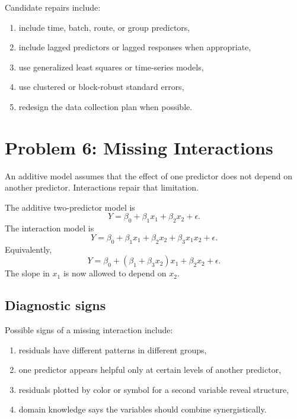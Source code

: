 Candidate repairs include:
\begin{enumerate}
  \item include time, batch, route, or group predictors,
  \item include lagged predictors or lagged responses when appropriate,
  \item use generalized least squares or time-series models,
  \item use clustered or block-robust standard errors,
  \item redesign the data collection plan when possible.
\end{enumerate}

\section{Problem 6: Missing Interactions}

An additive model assumes that the effect of one predictor does not depend on another predictor.  Interactions repair that limitation.

The additive two-predictor model is
\begin{equation}
  Y=\beta_0+\beta_1x_1+\beta_2x_2+\epsilon.
\end{equation}
The interaction model is
\begin{equation}
  Y=\beta_0+\beta_1x_1+\beta_2x_2+\beta_3x_1x_2+\epsilon.
\end{equation}
Equivalently,
\begin{equation}
  Y=\beta_0+(\beta_1+\beta_3x_2)x_1+\beta_2x_2+\epsilon.
\end{equation}
The slope in \(x_1\) is now allowed to depend on \(x_2\).

\subsection*{Diagnostic signs}

Possible signs of a missing interaction include:
\begin{enumerate}
  \item residuals have different patterns in different groups,
  \item one predictor appears helpful only at certain levels of another predictor,
  \item residuals plotted by color or symbol for a second variable reveal structure,
  \item domain knowledge says the variables should combine synergistically.
\end{enumerate}

